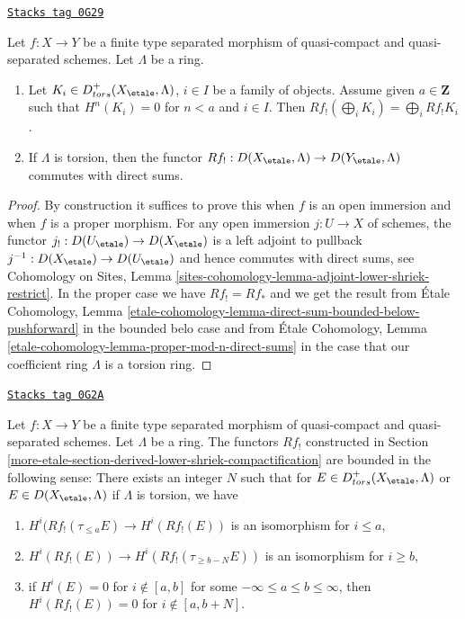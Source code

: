 \begin{lemma}
\label{more-etale-lemma-derived-lower-shriek-commute-direct-sums}
\href{https://stacks.math.columbia.edu/tag/0G29}{\texttt{Stacks tag 0G29}}

Let $f : X \to Y$ be a finite type separated morphism of quasi-compact
and quasi-separated schemes. Let $\Lambda$ be a ring.
\begin{enumerate}
\item Let $K_i \in D^+_{tors}(X_\etale, \Lambda)$, $i \in I$ be a family
of objects. Assume given $a \in \mathbf{Z}$ such that
$H^n(K_i) = 0$ for $n < a$ and $i \in I$. Then $Rf_!(\bigoplus_i K_i) =
\bigoplus_i Rf_!K_i$.
\item If $\Lambda$ is torsion, then the functor
$Rf_! : D(X_\etale, \Lambda) \to D(Y_\etale, \Lambda)$
commutes with direct sums.
\end{enumerate}
\end{lemma}

\begin{proof}
By construction it suffices to prove this when $f$ is an open immersion
and when $f$ is a proper morphism. For any open immersion $j : U \to X$
of schemes, the functor $j_! : D(U_\etale) \to D(X_\etale)$ is a left
adjoint to pullback $j^{-1} : D(X_\etale) \to D(U_\etale)$
and hence commutes with direct sums, see Cohomology on Sites, Lemma
\ref{sites-cohomology-lemma-adjoint-lower-shriek-restrict}.
In the proper case we have $Rf_! = Rf_*$ and we get the result from
\'Etale Cohomology, Lemma
\ref{etale-cohomology-lemma-direct-sum-bounded-below-pushforward}
in the bounded belo case and from
\'Etale Cohomology, Lemma \ref{etale-cohomology-lemma-proper-mod-n-direct-sums}
in the case that our coefficient ring $\Lambda$ is a torsion ring.
\end{proof}

\begin{lemma}
\label{more-etale-lemma-derived-lower-shriek-bounded}
\href{https://stacks.math.columbia.edu/tag/0G2A}{\texttt{Stacks tag 0G2A}}

Let $f : X \to Y$ be a finite type separated morphism of quasi-compact
and quasi-separated schemes. Let $\Lambda$ be a ring. The functors $Rf_!$
constructed in Section \ref{more-etale-section-derived-lower-shriek-compactification}
are bounded in the following sense: There exists an integer $N$ such that
for $E \in D^+_{tors}(X_\etale, \Lambda)$ or $E \in D(X_\etale, \Lambda)$
if $\Lambda$ is torsion, we have
\begin{enumerate}
\item $H^i(Rf_!(\tau_{\leq a}E) \to H^i(Rf_!(E))$ is an isomorphism
for $i \leq a$,
\item $H^i(Rf_!(E)) \to H^i(Rf_!(\tau_{\geq b - N}E))$ is an isomorphism
for $i \geq b$,
\item if $H^i(E) = 0$ for $i \not \in [a, b]$ for some
$-\infty \leq a \leq b \leq \infty$, then $H^i(Rf_!(E)) = 0$
for $i \not \in [a, b + N]$.
\end{enumerate}
\end{lemma}


